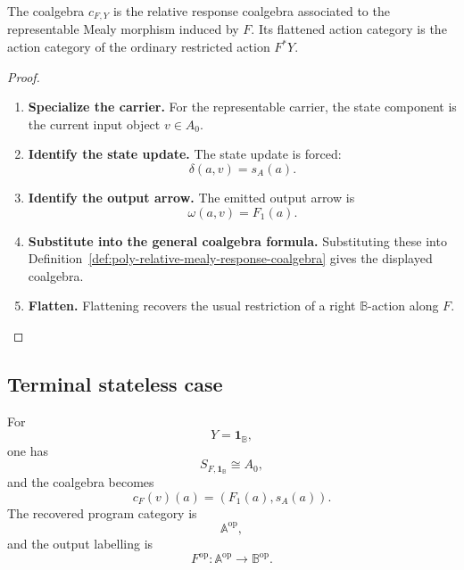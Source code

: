 \begin{proposition}
\label{prop:poly-relative-stateless-response-coalgebra}
The coalgebra \(c_{F,Y}\) is the relative response coalgebra associated to the
representable Mealy morphism induced by \(F\).  Its flattened action category
is the action category of the ordinary restricted action \(F^\ast Y\).
\end{proposition}

\begin{proof}
\leavevmode
\begin{enumerate}
\item \textbf{Specialize the carrier.}
For the representable carrier, the state component is the current input object
\(v\in A_0\).

\item \textbf{Identify the state update.}
The state update is forced:
\[
\delta(a,v)=s_A(a).
\]

\item \textbf{Identify the output arrow.}
The emitted output arrow is
\[
\omega(a,v)=F_1(a).
\]

\item \textbf{Substitute into the general coalgebra formula.}
Substituting these into
Definition~\ref{def:poly-relative-mealy-response-coalgebra} gives the
displayed coalgebra.

\item \textbf{Flatten.}
Flattening recovers the usual restriction of a right \(\mathbb B\)-action
along \(F\).
\end{enumerate}
\end{proof}

\subsection{Terminal stateless case}
\label{subsec:poly-relative-terminal-stateless-case}

\begin{corollary}
\label{cor:poly-relative-terminal-stateless-coalgebra}
For
\[
Y=\mathbf 1_{\mathbb B},
\]
one has
\[
S_{F,\mathbf 1_{\mathbb B}}\cong A_0,
\]
and the coalgebra becomes
\[
c_F(v)(a)=(F_1(a),s_A(a)).
\]
The recovered program category is
\[
\mathbb A^{\mathrm{op}},
\]
and the output labelling is
\[
F^{\mathrm{op}}:\mathbb A^{\mathrm{op}}\to\mathbb B^{\mathrm{op}}.
\]
\end{corollary}

